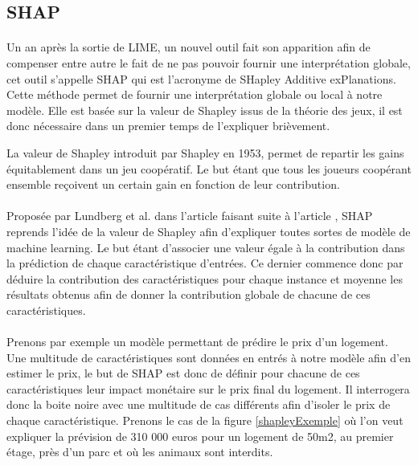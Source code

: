 \subsection{SHAP}
\paragraph{}Un an après la sortie de LIME, un nouvel outil fait son apparition afin de compenser entre autre le fait de ne pas pouvoir fournir une interprétation globale, cet outil s'appelle SHAP qui est l'acronyme de SHapley Additive exPlanations. Cette méthode permet de fournir une interprétation globale ou local à notre modèle. Elle est basée sur la valeur de Shapley issus de la théorie des jeux, il est donc nécessaire dans un premier temps de l'expliquer brièvement.\par
La valeur de Shapley introduit par Shapley en 1953, permet de repartir les gains équitablement dans un jeu coopératif. Le but étant que tous les joueurs coopérant ensemble reçoivent un certain gain en fonction de leur contribution.

\paragraph{}Proposée par Lundberg et al. dans l'article \cite{shapLast} faisant suite à l'article \cite{shapFirst}, SHAP reprends l'idée de la valeur de Shapley afin d'expliquer toutes sortes de modèle de machine learning. Le but étant d'associer une valeur égale à la contribution dans la prédiction de chaque caractéristique d'entrées. Ce dernier commence donc par déduire la contribution des caractéristiques pour chaque instance et moyenne les résultats obtenus afin de donner la contribution globale de chacune de ces caractéristiques.

\paragraph{}Prenons par exemple un modèle permettant de prédire le prix d'un logement. Une multitude de caractéristiques sont données en entrés à notre modèle afin d'en estimer le prix, le but de SHAP est donc de définir pour chacune de ces caractéristiques leur impact monétaire sur le prix final du logement. Il interrogera donc la boite noire avec une multitude de cas différents afin d'isoler le prix de chaque caractéristique. Prenons le cas de la figure \ref{shapleyExemple} où l'on veut expliquer la prévision de 310 000 euros pour un logement de 50m2, au premier étage, près d'un parc et où les animaux sont interdits.

